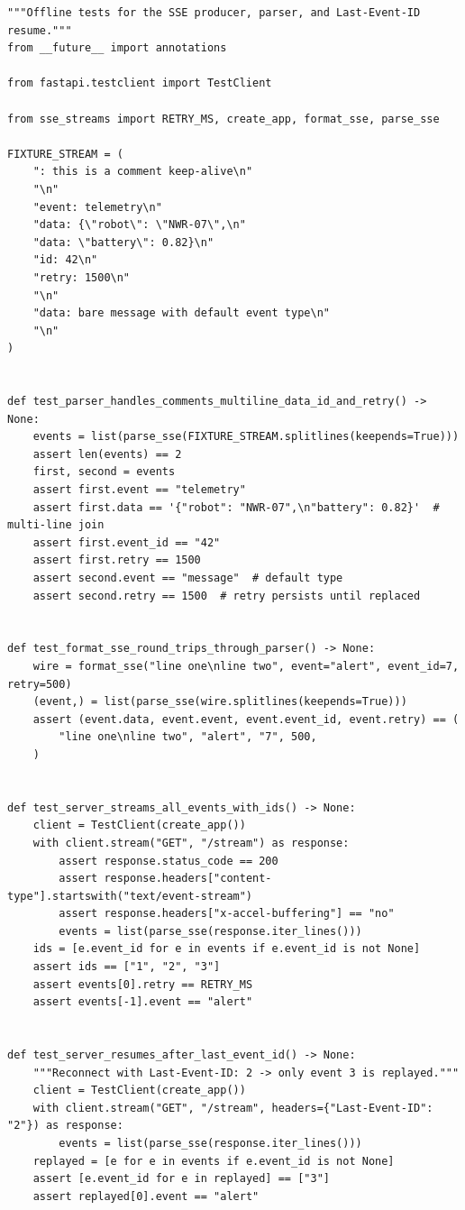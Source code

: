 \begin{verbatim}
"""Offline tests for the SSE producer, parser, and Last-Event-ID resume."""
from __future__ import annotations

from fastapi.testclient import TestClient

from sse_streams import RETRY_MS, create_app, format_sse, parse_sse

FIXTURE_STREAM = (
    ": this is a comment keep-alive\n"
    "\n"
    "event: telemetry\n"
    "data: {\"robot\": \"NWR-07\",\n"
    "data: \"battery\": 0.82}\n"
    "id: 42\n"
    "retry: 1500\n"
    "\n"
    "data: bare message with default event type\n"
    "\n"
)


def test_parser_handles_comments_multiline_data_id_and_retry() -> None:
    events = list(parse_sse(FIXTURE_STREAM.splitlines(keepends=True)))
    assert len(events) == 2
    first, second = events
    assert first.event == "telemetry"
    assert first.data == '{"robot": "NWR-07",\n"battery": 0.82}'  # multi-line join
    assert first.event_id == "42"
    assert first.retry == 1500
    assert second.event == "message"  # default type
    assert second.retry == 1500  # retry persists until replaced


def test_format_sse_round_trips_through_parser() -> None:
    wire = format_sse("line one\nline two", event="alert", event_id=7, retry=500)
    (event,) = list(parse_sse(wire.splitlines(keepends=True)))
    assert (event.data, event.event, event.event_id, event.retry) == (
        "line one\nline two", "alert", "7", 500,
    )


def test_server_streams_all_events_with_ids() -> None:
    client = TestClient(create_app())
    with client.stream("GET", "/stream") as response:
        assert response.status_code == 200
        assert response.headers["content-type"].startswith("text/event-stream")
        assert response.headers["x-accel-buffering"] == "no"
        events = list(parse_sse(response.iter_lines()))
    ids = [e.event_id for e in events if e.event_id is not None]
    assert ids == ["1", "2", "3"]
    assert events[0].retry == RETRY_MS
    assert events[-1].event == "alert"


def test_server_resumes_after_last_event_id() -> None:
    """Reconnect with Last-Event-ID: 2 -> only event 3 is replayed."""
    client = TestClient(create_app())
    with client.stream("GET", "/stream", headers={"Last-Event-ID": "2"}) as response:
        events = list(parse_sse(response.iter_lines()))
    replayed = [e for e in events if e.event_id is not None]
    assert [e.event_id for e in replayed] == ["3"]
    assert replayed[0].event == "alert"
\end{verbatim}

